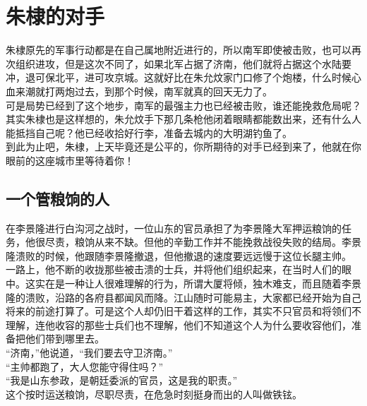 \section{朱棣的对手}
\ifnum{}
	\begin{multicols}{\theparacolNo}
\fi
朱棣原先的军事行动都是在自己属地附近进行的，所以南军即使被击败，也可以再次组织进攻，但是这次不同了，如果北军占据了济南，他们就将占据这个水陆要冲，退可保北平，进可攻京城。这就好比在朱允炆家门口修了个炮楼，什么时候心血来潮就打两炮过去，到那个时候，南军就真的回天无力了。\\

可是局势已经到了这个地步，南军的最强主力也已经被击败，谁还能挽救危局呢？\\

其实朱棣也是这样想的，朱允炆手下那几条枪他闭着眼睛都能数出来，还有什么人能抵挡自己呢？他已经收拾好行李，准备去城内的大明湖钓鱼了。\\

到此为止吧，朱棣，上天毕竟还是公平的，你所期待的对手已经到来了，他就在你眼前的这座城市里等待着你！\\

\subsection{一个管粮饷的人}
在李景隆进行白沟河之战时，一位山东的官员承担了为李景隆大军押运粮饷的任务，他很尽责，粮饷从来不缺。但他的辛勤工作并不能挽救战役失败的结局。李景隆溃败的时候，他跟随李景隆撤退，但他撤退的速度要远远慢于这位长腿主帅。\\

一路上，他不断的收拢那些被击溃的士兵，并将他们组织起来，在当时人们的眼中。这实在是一种让人很难理解的行为，所谓大厦将倾，独木难支，而且随着李景隆的溃败，沿路的各府县都闻风而降。江山随时可能易主，大家都已经开始为自己将来的前途打算了。可是这个人却仍旧干着这样的工作，其实不只官员和将领们不理解，连他收容的那些士兵们也不理解，他们不知道这个人为什么要收容他们，准备把他们带到哪里去。\\

“济南，”他说道，“我们要去守卫济南。”\\

“主帅都跑了，大人您能守得住吗？”\\

“我是山东参政，是朝廷委派的官员，这是我的职责。”\\

这个按时运送粮饷，尽职尽责，在危急时刻挺身而出的人叫做铁铉。\\


\end{multicols}
